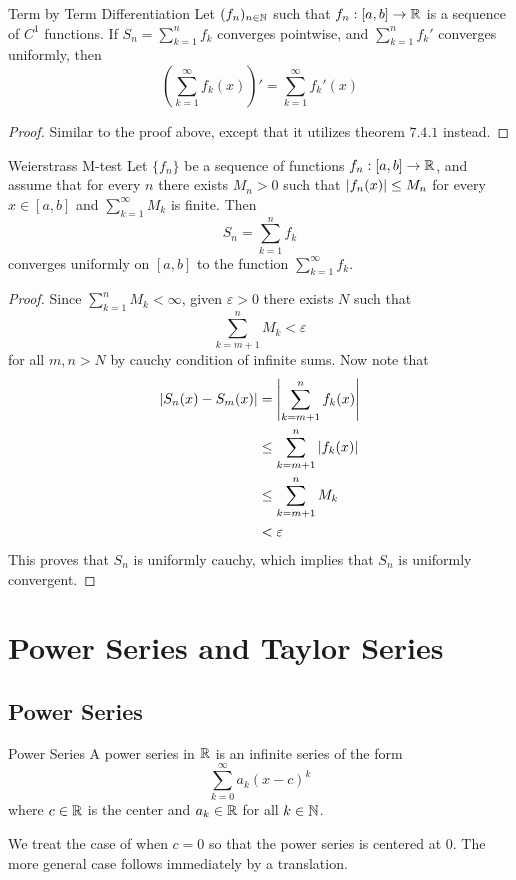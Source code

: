 \documentclass[a4paper]{article}
\begin{document}
\begin{thm}{Term by Term Differentiation}{} Let $(f_n)_{n\in\mathbb{N}}$ such that $f_n:[a,b]\to\mathbb{R}$ is a sequence of $C^1$ functions. If $S_n=\sum_{k=1}^nf_k$ converges pointwise, and $\sum_{k=1}^nf_k'$ converges uniformly, then $$\left(\sum_{k=1}^\infty f_k(x)\right)'=\sum_{k=1}^\infty f_k'(x)$$ \tcbline
\begin{proof} Similar to the proof above, except that it utilizes theorem $7.4.1$ instead. 
\end{proof}
\end{thm}

\begin{thm}{Weierstrass M-test}{} Let $\{f_n\}$ be a sequence of functions $f_n:[a,b]\to\mathbb{R}$, and assume that for every $n$ there exists $M_n>0$ such that $\abs{f_n(x)}\leq M_n$ for every $x\in[a,b]$ and $\sum_{k=1}^\infty M_k$ is finite. Then $$S_n=\sum_{k=1}^n f_k$$ converges uniformly on $[a,b]$ to the function $\sum_{k=1}^\infty f_k$. \tcbline
\begin{proof}
Since $\sum_{k=1}^nM_k<\infty$, given $\varepsilon>0$ there exists $N$ such that $$\sum_{k=m+1}^nM_k<\varepsilon$$ for all $m,n>N$ by cauchy condition of infinite sums. Now note that
\begin{align*}
\abs{S_n(x)-S_m(x)}&=\abs{\sum_{k=m+1}^nf_k(x)}\\
&\leq\sum_{k=m+1}^n\abs{f_k(x)}\\
&\leq\sum_{k=m+1}^nM_k\\
&<\varepsilon
\end{align*}
This proves that $S_n$ is uniformly cauchy, which implies that $S_n$ is uniformly convergent. 
\end{proof}
\end{thm}

\pagebreak
\section{Power Series and Taylor Series}
\subsection{Power Series}
\begin{defn}{Power Series}{} A power series in $\mathbb{R}$ is an infinite series of the form $$\sum_{k=0}^\infty a_k(x-c)^k$$ where $c\in\mathbb{R}$ is the center and $a_k\in\mathbb{R}$ for all $k\in\mathbb{N}$. 
\end{defn}

We treat the case of when $c=0$ so that the power series is centered at $0$. The more general case follows immediately by a translation. 
\end{document}

